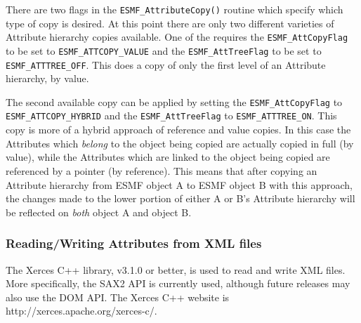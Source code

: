 There are two flags in the {\tt ESMF\_AttributeCopy()} routine which specify which type of copy is desired.  At this point there are only two different varieties of Attribute hierarchy copies available.  One of the requires the {\tt ESMF\_AttCopyFlag} to be set to {\tt ESMF\_ATTCOPY\_VALUE} and the {\tt ESMF\_AttTreeFlag} to be set to {\tt ESMF\_ATTTREE\_OFF}.  This does a copy of only the first level of an Attribute hierarchy, by value.

The second available copy can be applied by setting the {\tt ESMF\_AttCopyFlag} to {\tt ESMF\_ATTCOPY\_HYBRID} and the {\tt ESMF\_AttTreeFlag} to {\tt ESMF\_ATTTREE\_ON}.  This copy is more of a hybrid approach of reference and value copies.  In this case the Attributes which {\it belong} to the object being copied are actually copied in full (by value), while the Attributes which are linked to the object being copied are referenced by a pointer (by reference).  This means that after copying an Attribute hierarchy from ESMF object A to ESMF object B with this approach, the changes made to the lower portion of either A or B's Attribute hierarchy will be reflected on {\it both} object A and object B.

\subsubsection{Reading/Writing Attributes from XML files}
\label{Att:Xerces}

The Xerces C++ library, v3.1.0 or better, is used to read and write XML files.  More specifically, the SAX2 API is currently used, although future releases may also use the DOM API.  The Xerces C++ website is http://xerces.apache.org/xerces-c/.
